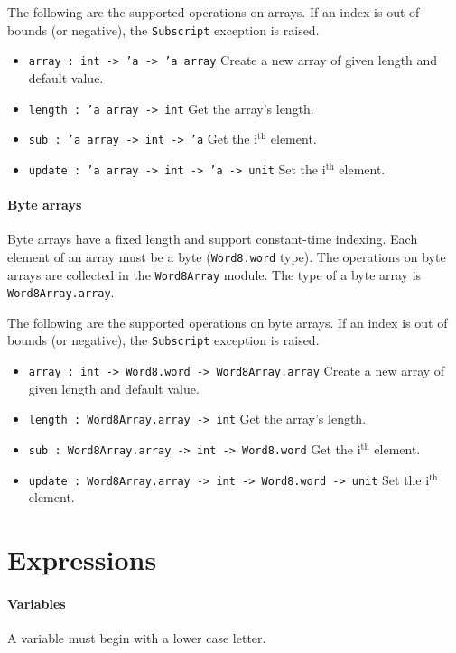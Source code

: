 \documentclass[12pt,a4paper]{book}
\begin{document}
The following are the supported operations on arrays. If an index is out of bounds (or negative), the \texttt{Subscript} exception is raised.
\begin{itemize}
\item \texttt{array : int -> 'a -> 'a array} Create a new array of given length and default value.
\item \texttt{length : 'a array -> int} Get the array's length.
\item \texttt{sub : 'a array -> int -> 'a} Get the i$^\textrm{th}$ element.
\item \texttt{update : 'a array -> int -> 'a -> unit} Set the i$^\textrm{th}$ element.
\end{itemize}


\paragraph{Byte arrays}
Byte arrays have a fixed length and support constant-time indexing. Each element of an array must be a byte (\texttt{Word8.word} type). The operations on byte arrays are collected in the \texttt{Word8Array} module. The type of a byte array is \texttt{Word8Array.array}.

The following are the supported operations on byte arrays. If an index is out of bounds (or negative), the \texttt{Subscript} exception is raised.
\begin{itemize}
\item \texttt{array : int -> Word8.word -> Word8Array.array} Create a new array of given length and default value.
\item \texttt{length : Word8Array.array -> int} Get the array's length.
\item \texttt{sub : Word8Array.array -> int -> Word8.word} Get the i$^\textrm{th}$ element.
\item \texttt{update : Word8Array.array -> int -> Word8.word -> unit} Set the i$^\textrm{th}$ element.
\end{itemize}

\section{Expressions}
\label{expressions}

\paragraph{Variables}

A variable must begin with a lower case letter.
\end{document}
